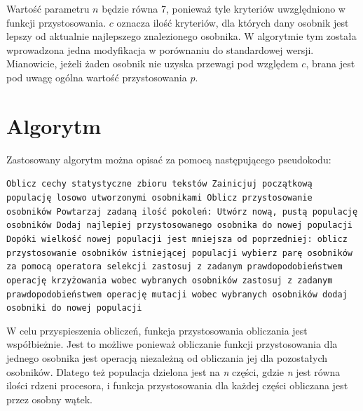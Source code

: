 \documentclass[brudnopis]{xmgr}
\begin{document}
Wartość parametru $n$ będzie równa 7, ponieważ tyle kryteriów uwzględniono w funkcji przystosowania. $c$ oznacza ilość kryteriów, dla których dany osobnik jest lepszy od aktualnie najlepszego znalezionego osobnika. W algorytmie tym została wprowadzona jedna modyfikacja w porównaniu do standardowej wersji. Mianowicie, jeżeli żaden osobnik nie uzyska przewagi pod względem $c$, brana jest pod uwagę ogólna wartość przystosowania $p$.


\section{Algorytm}

Zastosowany algorytm można opisać za pomocą następującego pseudokodu:\newline

\noindent
\texttt{Oblicz cechy statystyczne zbioru tekstów\newline
Zainicjuj początkową populację losowo utworzonymi osobnikami\newline
Oblicz przystosowanie osobników\newline
Powtarzaj zadaną ilość pokoleń:\newline
\indent Utwórz nową, pustą populację osobników\newline
\indent Dodaj najlepiej przystosowanego osobnika do nowej populacji\newline
\indent Dopóki wielkość nowej populacji jest mniejsza od poprzedniej:\newline
\indent\indent oblicz przystosowanie osobników istniejącej populacji\newline
\indent\indent wybierz parę osobników za pomocą operatora selekcji\newline
\indent\indent zastosuj z zadanym prawdopodobieństwem operację krzyżowania\newline
\indent\indent wobec wybranych osobników\newline
\indent\indent zastosuj z zadanym prawdopodobieństwem operację mutacji\newline
\indent\indent wobec wybranych osobników\newline
\indent\indent dodaj osobniki do nowej populacji\newline
}

W celu przyspieszenia obliczeń, funkcja przystosowania obliczania jest współbieżnie. Jest to możliwe ponieważ obliczanie funkcji przystosowania dla jednego osobnika jest operacją niezależną od obliczania jej dla pozostałych osobników. Dlatego też populacja dzielona jest na \emph{n} części, gdzie \emph{n} jest równa ilości rdzeni procesora, i funkcja przystosowania dla każdej części obliczana jest przez osobny wątek.
\end{document}
